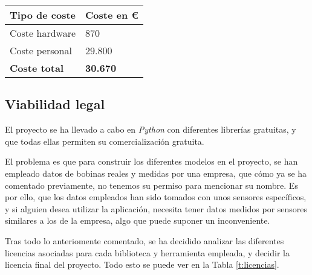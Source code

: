 \begin{center}
\begin{tabular}{|l|l|}
\hline
\textbf{Tipo de coste} & \textbf{Coste en €} \\ \hline
Coste hardware         & 870                 \\ \hline
Coste personal         & 29.800              \\ \hline
\textbf{Coste total}   & \textbf{30.670}     \\ \hline
\end{tabular}
\label{t:costot}
\end{center}

\subsection{Viabilidad legal}
El proyecto se ha llevado a cabo en \emph{Python} con diferentes librerías gratuitas, y que todas ellas permiten su comercialización gratuita. 

El problema es que para construir los diferentes modelos en el proyecto, se han empleado datos de bobinas reales y medidas por una empresa, que cómo ya se ha comentado previamente, no tenemos su permiso para mencionar su nombre. Es por ello, que los datos empleados han sido tomados con unos sensores específicos, y si alguien desea utilizar la aplicación, necesita tener datos medidos por sensores similares a los de la empresa, algo que puede suponer un inconveniente.

Tras todo lo anteriomente comentado, se ha decidido analizar las diferentes licencias asociadas para cada biblioteca y herramienta empleada, y decidir la licencia final del proyecto. Todo esto se puede ver en la Tabla \ref{t:licencias}.


